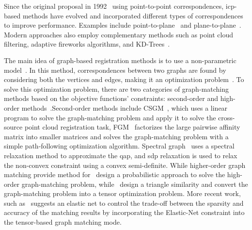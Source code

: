 Since the original proposal in 1992~\cite{a-method-for-registration-of-3-d-shapes} using point-to-point correspondences, \gls{icp}-based methods have evolved and incorporated different types of correspondences to improve performance. Examples include point-to-plane~\cite{object-modelling-by-registration-of-multiple-range-images} and plane-to-plane~\cite{generalized-icp}. Modern approaches also employ complementary methods such as point cloud filtering, adaptive fireworks algorithms, and KD-Trees~\cite{improved-iterative-closest-point-icp-3d-point-cloud-registration-algorithm-based-on-point-cloud-filtering-and-adaptive-fireworks-for-coarse-registration}. \medskip

The main idea of graph-based registration methods is to use a non-parametric model~\cite{a-review-of-point-set-registration:-from-pairwise-registration-to-groupwise-registration}. In this method, correspondences between two graphs are found by considering both the vertices and edges, making it an optimization problem~\cite{a-review-of-point-set-registration:-from-pairwise-registration-to-groupwise-registration}. To solve this optimization problem, there are two categories of graph-matching methods based on the objective functions' constraints: second-order and high-order methods~\cite{the-graph-matching-problem}.Second-order methods include CSGM~\cite{a-systematic-approach-for-cross-source-point-cloud-registration-by-preserving-macro-and-micro-structures}, which uses a linear program to solve the graph-matching problem and apply it to solve the cross-source point cloud registration task, FGM~\cite{factorized-graph-matching} factorizes the large pairwise affinity matrix into smaller matrices and solves the graph-matching problem with a simple path-following optimization algorithm. Spectral graph~\cite{a-spectral-technique-for-correspondence-problems-using-pairwise-constraints} uses a spectral relaxation method to approximate the \gls{qap}, and \gls{sdp} relaxation is used to relax the non-convex constraint using a convex semi-definite. While higher-order graph matching provide method for~\cite{probabilistic-graph-and-hypergraph-matching} design a probabilistic approach to solve the high-order graph-matching problem, while~\cite{a-tensor-based-algorithm-for-high-order-graph-matching} design a triangle similarity and convert the graph-matching problem into a tensor optimization problem. More recent work, such as~\cite{elastic-net-constraint-based-tensor-model-for-high-order-graph-matching} suggests an elastic net to control the trade-off between the sparsity and accuracy of the matching results by incorporating the Elastic-Net constraint into the tensor-based graph matching mode. \medskip

